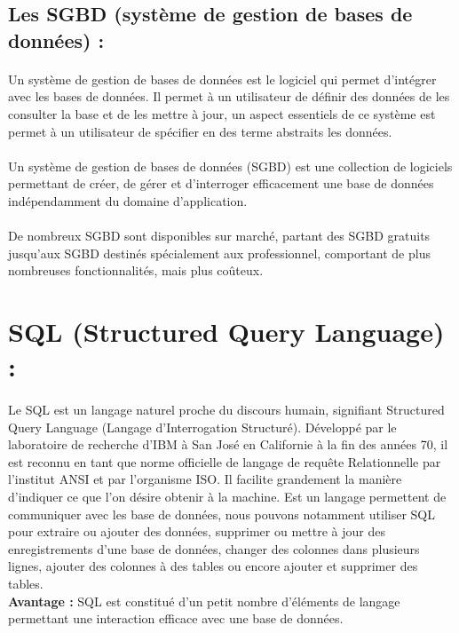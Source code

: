 \subsection{Les SGBD (système de gestion de bases de données) :}
\paragraph{}
Un système de gestion de bases de données est le logiciel qui permet d’intégrer avec les bases de données. Il permet à un utilisateur de définir des données de les consulter la base et de les mettre à jour, un aspect essentiels de ce système est permet à un utilisateur de spécifier en des terme abstraits les données.
\paragraph{}
Un système de gestion de bases de données (SGBD) est une collection de logiciels permettant de créer, de gérer et d’interroger efficacement une base de données indépendamment du domaine d’application.
\paragraph{}
De nombreux SGBD sont disponibles sur marché, partant des SGBD gratuits jusqu’aux SGBD destinés spécialement aux professionnel, comportant de plus nombreuses fonctionnalités, mais plus coûteux.
\section{SQL (Structured Query Language) :}
\paragraph{}
Le SQL est un langage naturel proche du discours humain, signifiant Structured Query Language (Langage d'Interrogation Structuré). Développé par le laboratoire de recherche d'IBM à San José en Californie
à la fin des années 70, il est reconnu en tant que norme officielle de langage de requête Relationnelle par l'institut ANSI et par l'organisme ISO. Il facilite grandement la manière d'indiquer ce que l'on désire obtenir à la machine. Est un langage permettent de communiquer avec les base de données,
nous pouvons notamment utiliser SQL pour extraire ou ajouter des données, supprimer ou mettre à jour des enregistrements d’une base de données, changer des colonnes dans plusieurs lignes, ajouter des colonnes
à des tables ou encore ajouter et supprimer des tables.\\
\textbf{Avantage :} SQL est constitué d’un petit nombre d’éléments de langage permettant une interaction efficace avec une base de données.
